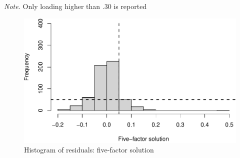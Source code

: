 \documentclass[
  english,
  man]{apa6}
\begin{document}
\begin{table}[tbp]
\begin{center}
\begin{threeparttable}
{}

\begin{tablenotes}[para]
\normalsize{\textit{Note.} Only loading higher than .30 is reported}
\end{tablenotes}

\end{threeparttable}
\end{center}

\end{table}

\begin{figure}

{\centering \includegraphics[width=1\linewidth,height=1\textheight]{manuscript_files/figure-latex/EFAResiduals-1} 

}

\caption{ Histogram of residuals:  five-factor solution}\label{fig:EFAResiduals}
\end{figure}
\end{document}
